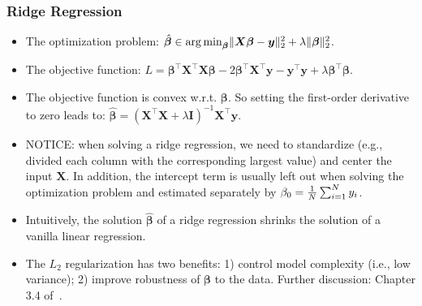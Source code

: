     \subsubsection{Ridge Regression}
        \begin{itemize}
            \item The optimization problem: $\hat{\bm{\beta}} \in \operatorname{arg\,min}_{\bm{\beta}} \lVert\bm{X} \bm{\beta} - \bm{y}\rVert_2^2 + \lambda\lVert\bm{\beta}\rVert_2^2$.
            \item The objective function: $L = \bm{\beta}^\top \bm{X}^\top \bm{X} \bm{\beta} - 2 \bm{\beta}^\top \bm{X}^\top \bm{y} - \bm{y}^\top \bm{y} + \lambda \bm{\beta}^\top \bm{\beta}$.
            \item The objective function is convex w.r.t. $\bm{\beta}$. So setting the first-order derivative to zero leads to: $\hat{\bm{\beta}} = (\bm{X}^\top \bm{X} + \lambda \bm{I})^{-1} \bm{X}^\top \bm{y}$.
            \item NOTICE: when solving a ridge regression, we need to standardize (e.g., divided each column with the corresponding largest value)  and center the input $\bm{X}$. In addition, the intercept term is usually left out when solving the optimization problem and estimated separately by $\beta_0 = \frac{1}{N}\sum_{i=1}^{N}{y_i}$.
            \item Intuitively, the solution $\hat{\bm{\beta}}$ of a ridge regression shrinks the solution of a vanilla linear regression.
            \item The $L_2$ regularization has two benefits: 1) control model complexity (i.e., low variance); 2) improve robustness of $\bm{\beta}$ to the data. Further discussion: Chapter 3.4 of~\cite{hastie2009elements}.
        \end{itemize}
        

